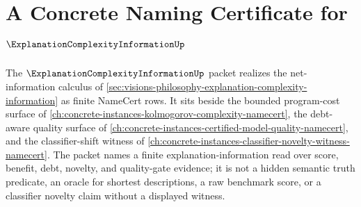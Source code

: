 \chapter{A Concrete Naming Certificate for $\ExplanationComplexityInformationUp$}
\label{ch:concrete-instances-explanation-complexity-information-namecert}

The $\ExplanationComplexityInformationUp$ packet realizes the net-information calculus of \autoref{sec:visions-philosophy-explanation-complexity-information} as finite NameCert rows. It sits beside the bounded program-cost surface of \autoref{ch:concrete-instances-kolmogorov-complexity-namecert}, the debt-aware quality surface of \autoref{ch:concrete-instances-certified-model-quality-namecert}, and the classifier-shift witness of \autoref{ch:concrete-instances-classifier-novelty-witness-namecert}. The packet names a finite explanation-information read over score, benefit, debt, novelty, and quality-gate evidence; it is not a hidden semantic truth predicate, an oracle for shortest descriptions, a raw benchmark score, or a classifier novelty claim without a displayed witness.

